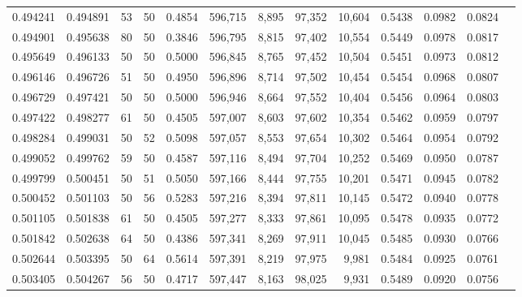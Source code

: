 \begin{tabular}{rrrrrrrrrrrrr}
0.494241 & 0.494891 &    53 &  50 &                                     0.4854 & 596,715 &   8,895 &  97,352 &  10,604 & 0.5438 & 0.0982 & 0.0824 \\
0.494901 & 0.495638 &    80 &  50 &                                     0.3846 & 596,795 &   8,815 &  97,402 &  10,554 & 0.5449 & 0.0978 & 0.0817 \\
0.495649 & 0.496133 &    50 &  50 &                                     0.5000 & 596,845 &   8,765 &  97,452 &  10,504 & 0.5451 & 0.0973 & 0.0812 \\
0.496146 & 0.496726 &    51 &  50 &                                     0.4950 & 596,896 &   8,714 &  97,502 &  10,454 & 0.5454 & 0.0968 & 0.0807 \\
0.496729 & 0.497421 &    50 &  50 &                                     0.5000 & 596,946 &   8,664 &  97,552 &  10,404 & 0.5456 & 0.0964 & 0.0803 \\
0.497422 & 0.498277 &    61 &  50 &                                     0.4505 & 597,007 &   8,603 &  97,602 &  10,354 & 0.5462 & 0.0959 & 0.0797 \\
0.498284 & 0.499031 &    50 &  52 &                                     0.5098 & 597,057 &   8,553 &  97,654 &  10,302 & 0.5464 & 0.0954 & 0.0792 \\
0.499052 & 0.499762 &    59 &  50 &                                     0.4587 & 597,116 &   8,494 &  97,704 &  10,252 & 0.5469 & 0.0950 & 0.0787 \\
0.499799 & 0.500451 &    50 &  51 &                                     0.5050 & 597,166 &   8,444 &  97,755 &  10,201 & 0.5471 & 0.0945 & 0.0782 \\
0.500452 & 0.501103 &    50 &  56 &                                     0.5283 & 597,216 &   8,394 &  97,811 &  10,145 & 0.5472 & 0.0940 & 0.0778 \\
0.501105 & 0.501838 &    61 &  50 &                                     0.4505 & 597,277 &   8,333 &  97,861 &  10,095 & 0.5478 & 0.0935 & 0.0772 \\
0.501842 & 0.502638 &    64 &  50 &                                     0.4386 & 597,341 &   8,269 &  97,911 &  10,045 & 0.5485 & 0.0930 & 0.0766 \\
0.502644 & 0.503395 &    50 &  64 &                                     0.5614 & 597,391 &   8,219 &  97,975 &   9,981 & 0.5484 & 0.0925 & 0.0761 \\
0.503405 & 0.504267 &    56 &  50 &                                     0.4717 & 597,447 &   8,163 &  98,025 &   9,931 & 0.5489 & 0.0920 & 0.0756 \\

\end{tabular}
